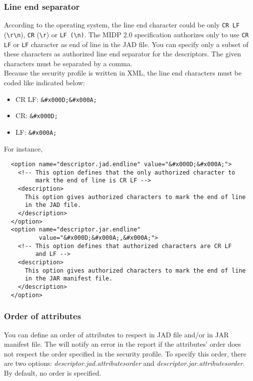 \subsubsection{Line end separator}
According to the operating system, the line end character could be only
\texttt{CR LF} (\verb!\r\n!), \texttt{CR} 
(\verb!\r!) or \verb!LF (\n)!. The MIDP 2.0 specification
authorizes only to use \texttt{CR LF} or \texttt{LF} character as end of line in
the JAD file. You can specify only a subset of these characters as
authorized line end separator for the descriptors. The given characters must be
separated by a comma.\\
Because the security profile is written in XML, the line end characters must be
coded like indicated below:
\begin{itemize}
  \item{CR LF}: \verb!&#x000D;&#x000A;!
  \item{CR}: \verb!&#x000D;!
  \item{LF}: \verb!&#x000A;!
\end{itemize}

For instance,
\begin{verbatim}
  <option name="descriptor.jad.endline" value="&#x000D;&#x000A;">
    <!-- This option defines that the only authorized character to 
         mark the end of line is CR LF -->
    <description>
      This option gives authorized characters to mark the end of line 
	  in the JAD file.
    </description>
  </option>
  <option name="descriptor.jar.endline" 
          value="&#x000D;&#x000A;,&#x000A;">
    <!-- This option defines that authorized characters are CR LF 
         and LF -->
    <description>
      This option gives authorized characters to mark the end of line 
      in the JAR manifest file.
    </description>
  </option>
\end{verbatim}

\subsubsection{Order of attributes}

You can define an order of attributes to respect in JAD file and/or in JAR
manifest file. The \ma will notify an error in the report if the attributes' 
order does not respect the order specified in the security profile. To specify
this order, there are two options: \emph{descriptor.jad.attributesorder} and
\emph{descriptor.jar.attributesorder}. By default, no order is specified.

